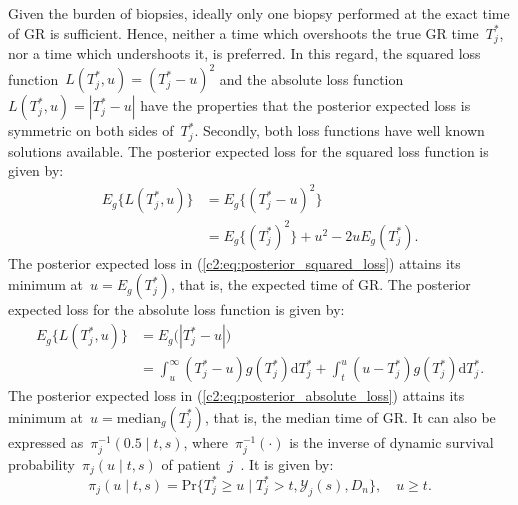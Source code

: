 Given the burden of biopsies, ideally only one biopsy performed at the exact time of GR is sufficient. Hence, neither a time which overshoots the true GR time~$T^*_j$, nor a time which undershoots it, is preferred. In this regard, the squared loss function~$L(T^*_j, u) = (T^*_j - u)^2$ and the absolute loss function~$L(T^*_j, u) = \left|{T^*_j - u}\right|$ have the properties that the posterior expected loss is symmetric on both sides of~$T^*_j$. Secondly, both loss functions have well known solutions available. The posterior expected loss for the squared loss function is given by:
\begin{equation}
\label{c2:eq:posterior_squared_loss}
\begin{split}
E_g\big\{L(T^*_j, u)\big\} &= E_g\big\{(T^*_j - u)^2\big\}\\
&=E_g\big\{(T^*_j)^2\big\} + u^2 -2uE_g(T^*_j).
\end{split}
\end{equation}
The posterior expected loss in (\ref{c2:eq:posterior_squared_loss}) attains its minimum at~$u = E_g(T^*_j)$, that is, the expected time of GR. The posterior expected loss for the absolute loss function is given by:
\begin{equation}
\label{c2:eq:posterior_absolute_loss}
\begin{split}
E_g\big\{L(T^*_j, u)\big\} &= E_g\big(\left|{T^*_j - u}\right|\big)\\
&= \int_u^\infty (T^*_j - u) g(T^*_j)\mathrm{d} T^*_j + \int_t^u (u - T^*_j) g(T^*_j)\mathrm{d} T^*_j.
\end{split}
\end{equation}
The posterior expected loss in (\ref{c2:eq:posterior_absolute_loss}) attains its minimum at~$u=\mbox{median}_g(T^*_j)$, that is, the median time of GR. It can also be expressed as~$\pi_j^{-1}(0.5 \mid t,s)$, where~$\pi_j^{-1}(\cdot)$ is the inverse of dynamic survival probability~$\pi_j(u \mid t, s)$ of patient~$j$~\citep{rizopoulos2011dynamic}. It is given by:
\begin{equation*}
\label{c2:eq:dynamic_surv_prob}
\pi_j(u \mid t, s) = \mbox{Pr}\big\{T^*_j \geq u \mid  T^*_j >t, \mathcal{Y}_j(s), D_n\big\}, \quad u \geq t.
\end{equation*}

